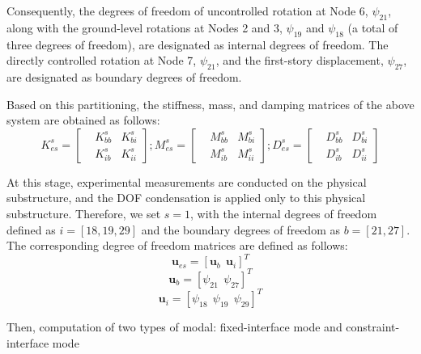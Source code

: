 \documentclass[a4paper, 10pt, conference]{ieeeconf}      %
\begin{document}
Consequently, the degrees of freedom of uncontrolled rotation at Node 6, $\psi_{21}$, along with the ground-level rotations at Nodes 2 and 3, $\psi_{19}$ and $\psi_{18}$ (a total of three degrees of freedom), are designated as internal degrees of freedom. The directly controlled rotation at Node 7, $\psi_{21}$, and the first-story displacement, $\psi_{27}$, are designated as boundary degrees of freedom. 

Based on this partitioning, the stiffness, mass, and damping matrices of the above system are obtained as follows:
\begin{equation}
    K^s_{es} = \left[\begin{aligned} & K^s_{bb} & K^s_{bi} \\ & K^s_{ib} & K^s_{ii}\end{aligned} \right]; M^s_{es} = \left[\begin{aligned} & M^s_{bb} & M^s_{bi} \\ & M^s_{ib} & M^s_{ii}\end{aligned} \right]; D^s_{es} = \left[\begin{aligned} & D^s_{bb} & D^s_{bi} \\ & D^s_{ib} & D^s_{ii}\end{aligned} \right]
\end{equation}

At this stage, experimental measurements are conducted on the physical substructure, and the DOF condensation is applied only to this physical substructure. Therefore, we set $s = 1$, with the internal degrees of freedom defined as $i = \left[18, 19, 29\right]$ and the boundary degrees of freedom as $b = \left[21, 27\right]$. The corresponding degree of freedom matrices are defined as follows:
\begin{equation}
    \mathbf{u}_{es} = \left[\mathbf{u}_b ~~ \mathbf{u}_i\right]^T
\end{equation}
\begin{equation}
    \mathbf{u}_{b} = \left[\psi_{21} ~~ \psi_{27} \right]^T
\end{equation}
\begin{equation}
    \mathbf{u}_{i} = \left[\psi_{18} ~~ \psi_{19} ~~ \psi_{29}\right]^T
\end{equation}

Then, computation of two types of modal: fixed-interface mode and constraint-interface mode 
\end{document}
